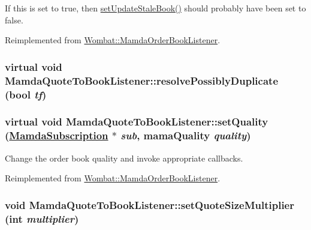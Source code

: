 If this is set to true, then \hyperlink{classMamdaQuoteToBookListener_008e8954749115fa7cedc257e61480c3}{set\-Update\-Stale\-Book()} should probably have been set to false. 

Reimplemented from \hyperlink{classWombat_1_1MamdaOrderBookListener_6dd743bb5c20544a503004f6053a1fda}{Wombat::Mamda\-Order\-Book\-Listener}.\hypertarget{classMamdaQuoteToBookListener_37bc9813dd682b3f87909d641116c851}{
\subsubsection[resolvePossiblyDuplicate]{\setlength{\rightskip}{0pt plus 5cm}virtual void Mamda\-Quote\-To\-Book\-Listener::resolve\-Possibly\-Duplicate (bool {\em tf})}}
\label{classMamdaQuoteToBookListener_37bc9813dd682b3f87909d641116c851}


\hypertarget{classMamdaQuoteToBookListener_185182e79f1a315dd2667b44cb466159}{
\subsubsection[setQuality]{\setlength{\rightskip}{0pt plus 5cm}virtual void Mamda\-Quote\-To\-Book\-Listener::set\-Quality (\hyperlink{classWombat_1_1MamdaSubscription}{Mamda\-Subscription} $\ast$ {\em sub}, mama\-Quality {\em quality})}}
\label{classMamdaQuoteToBookListener_185182e79f1a315dd2667b44cb466159}


Change the order book quality and invoke appropriate callbacks. 



Reimplemented from \hyperlink{classWombat_1_1MamdaOrderBookListener_224baaa3e2a4d9d5fe5b062cf9fe1082}{Wombat::Mamda\-Order\-Book\-Listener}.\hypertarget{classMamdaQuoteToBookListener_0f61b24aec6c1ca1a916c669bf9ab624}{
\subsubsection[setQuoteSizeMultiplier]{\setlength{\rightskip}{0pt plus 5cm}void Mamda\-Quote\-To\-Book\-Listener::set\-Quote\-Size\-Multiplier (int {\em multiplier})}}
\label{classMamdaQuoteToBookListener_0f61b24aec6c1ca1a916c669bf9ab624}


